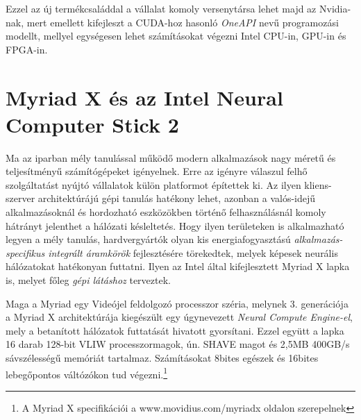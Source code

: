 Ezzel az új termékcsaláddal a vállalat komoly versenytársa lehet majd az Nvidia-nak, mert emellett kifejleszt a CUDA-hoz hasonló \emph{OneAPI} nevű programozási modellt, mellyel egységesen lehet számításokat végezni Intel CPU-in, GPU-in és FPGA-in.\cite{patrizio-networkworld}

\section{Myriad X és az Intel Neural Computer Stick 2}
Ma az iparban mély tanulással működő modern alkalmazások nagy méretű és teljesítményű számítógépeket igényelnek. Erre az igényre válaszul felhő szolgáltatást nyújtó vállalatok külön platformot építettek ki. Az ilyen kliens-szerver architektúrájú gépi tanulás hatékony lehet, azonban a valós-idejű alkalmazásoknál és hordozható eszközökben történő felhasználásnál komoly hátrányt jelenthet a hálózati késleltetés. Hogy ilyen területeken is alkalmazható legyen a mély tanulás, hardvergyártók olyan kis energiafogyasztású \emph{alkalmazás-specifikus integrált áramkörök} fejlesztésére törekedtek, melyek képesek neurális hálózatokat hatékonyan futtatni. Ilyen az Intel által kifejlesztett Myriad X lapka is, melyet főleg \emph{gépi látáshoz} terveztek.

Maga a Myriad egy Videójel feldolgozó processzor széria, melynek 3. generációja a Myriad X architektúrája kiegészült egy úgynevezett \emph{Neural Compute Engine-el}, mely a betanított hálózatok futtatását hivatott gyorsítani. Ezzel együtt a lapka 16 darab 128-bit VLIW processzormagok, ún. SHAVE magot és 2,5MB 400GB/s sávszélességű memóriát tartalmaz. Számításokat 8bites egészek és 16bites lebegőpontos váltózókon tud végezni.\footnote{A Myriad X specifikációi a www.movidius.com/myriadx oldalon szerepelnek} 


